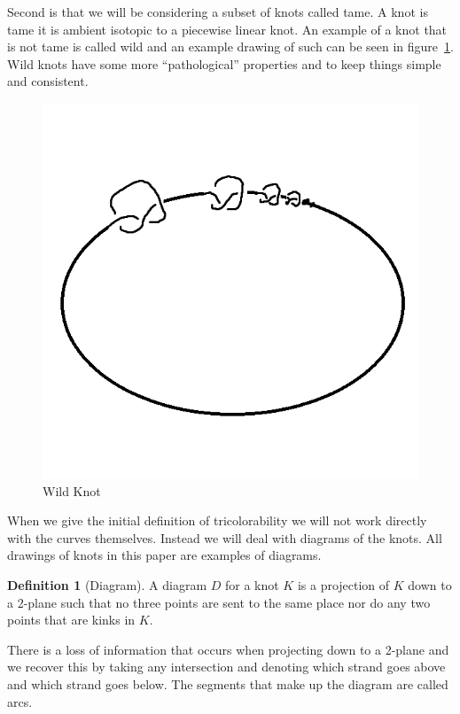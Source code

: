 \documentclass[12pt]{amsart}
\theoremstyle{definition}
\newtheorem{definition}[theorem]{Definition}
\theoremstyle{remark}
\numberwithin{equation}{section}
\newcommand{\ds}{.3}
\begin{document}
Second is that we will be considering a subset of knots called tame. A knot
is tame it is ambient isotopic to a piecewise linear knot. An example of
a knot that is not tame is called wild and an example drawing of such can be
seen in figure~\ref{fig:wild}. Wild knots have some more ``pathological''
properties and to keep things simple and consistent.

\begin{figure}
  \includegraphics[scale=\ds]{wild}
  \caption{Wild Knot}
  \label{fig:wild}
\end{figure}

When we give the initial definition of  tricolorability we will not work
directly with the curves themselves. Instead we will deal with diagrams
of the knots. All drawings of knots in this paper are examples of diagrams.

\begin{definition}[Diagram]
  A diagram $D$ for a knot $K$ is a projection of $K$ down to a 2-plane
  such that no three points are sent to the same place nor do any two
  points that are kinks in $K$.
\end{definition}

There is a loss of information that occurs when projecting down to a 2-plane
and we recover this by taking any intersection and denoting which strand
goes above and which strand goes below. The segments that make up the
diagram are called arcs.
\end{document}

